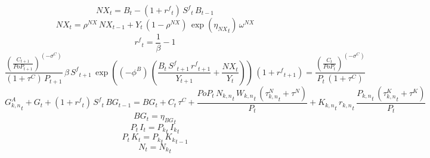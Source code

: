 \begin{dmath}
{NX}_{t}={B}_{t}-\left(1+{{r^{f}}}_{t}\right)\, {S^{f}}_{t}\, {B}_{t-1}
\end{dmath}
\noindent[name= `LOM Net Exports']
\begin{dmath}
{NX}_{t}={{\rho^{NX}}}\, {NX}_{t-1}+{Y}_{t}\, \left(1-{{\rho^{NX}}}\right)\, \exp\left({{\eta_{NX}}}_{t}\right)\, {{\omega^{NX}}}
\end{dmath}
\noindent[name= `World interest rate']
\begin{dmath}
{{r^{f}}}_{t}=\frac{1}{{{\beta}}}-1
\end{dmath}
\noindent[name= `Foreign Assets']
\begin{dmath}
\frac{\left(\frac{{C}_{t+1}}{{PoP}_{t+1}}\right)^{\left(-{{\sigma^{C}}}\right)}}{\left(1+{{\tau^{C}}}\right)\, {P}_{t+1}}\, {{\beta}}\, {S^{f}}_{t+1}\, \exp\left(\left(-{{\phi^{B}}}\right)\, \left(\frac{{B}_{t}\, {S^{f}}_{t+1}\, {{r^{f}}}_{t+1}}{{Y}_{t+1}}+\frac{{NX}_{t}}{{Y}_{t}}\right)\right)\, \left(1+{{r^{f}}}_{t+1}\right)=\frac{\left(\frac{{C}_{t}}{{PoP}_{t}}\right)^{\left(-{{\sigma^{C}}}\right)}}{{P}_{t}\, \left(1+{{\tau^{C}}}\right)}
\end{dmath}
\noindent[name= `Government Budget Constraint']
\begin{dmath}
{{G^{A}_{k,n}}}_{t}+{G}_{t}+\left(1+{{r^{f}}}_{t}\right)\, {S^{f}}_{t}\, {BG}_{t-1}={BG}_{t}+{C}_{t}\, {{\tau^{C}}}+\frac{{PoP}_{t}\, {{N_{k,n}}}_{t}\, {{W_{k,n}}}_{t}\, \left({{\tau^{N}_{k,n}}}_{t}+{{\tau^{N}}}\right)}{{P}_{t}}+{{K_{k,n}}}_{t}\, {{r_{k,n}}}_{t}\, \frac{{{P_{k,n}}}_{t}\, \left({{\tau^{K}_{k,n}}}_{t}+{{\tau^{K}}}\right)}{{P}_{t}}
\end{dmath}
\noindent[name= `Government Budget Constraint']
\begin{dmath}
{BG}_{t}={{\eta_{BG}}}_{t}
\end{dmath}
\noindent[name= `aggregate investment']
\begin{dmath}
{P}_{t}\, {I}_{t}={{P_k}}_{t}\, {{I_k}}_{t}
\end{dmath}
\noindent[name= `aggregate capital']
\begin{dmath}
{P}_{t}\, {K}_{t}={{P_k}}_{t}\, {{K_k}}_{t-1}
\end{dmath}
\noindent[name= `aggregate labour']
\begin{dmath}
{N}_{t}={{N_k}}_{t}
\end{dmath}
